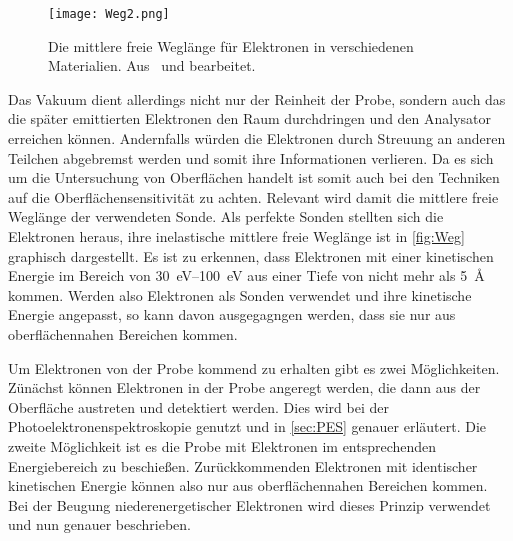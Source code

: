         \begin{figure}
            \centering
            \texttt{[image: Weg2.png]}
            \caption{Die mittlere freie Weglänge für Elektronen in verschiedenen Materialien. Aus~\cite{Hüfner} und bearbeitet.}
            \label{fig:Weg}
        \end{figure}
        Das Vakuum dient allerdings nicht nur der Reinheit der Probe, sondern auch das die später emittierten Elektronen den Raum durchdringen und den Analysator erreichen können.
        Andernfalls würden die Elektronen durch Streuung an anderen Teilchen abgebremst werden und somit ihre Informationen verlieren.
        Da es sich um die Untersuchung von Oberflächen handelt ist somit auch bei den Techniken auf die Oberflächensensitivität zu achten.
        Relevant wird damit die mittlere freie Weglänge der verwendeten Sonde.
        Als perfekte Sonden stellten sich die Elektronen heraus, ihre inelastische mittlere freie Weglänge ist in \autoref{fig:Weg} graphisch dargestellt.
        Es ist zu erkennen, dass Elektronen mit einer kinetischen Energie im Bereich von \SIrange{30}{100}{\electronvolt} aus einer Tiefe von nicht mehr als \SI{5}{\angstrom} kommen.
        Werden also Elektronen als Sonden verwendet und ihre kinetische Energie angepasst, so kann davon ausgegagngen werden, dass sie nur aus oberflächennahen Bereichen kommen.

        Um Elektronen von der Probe kommend zu erhalten gibt es zwei Möglichkeiten.
        Zünächst können Elektronen in der Probe angeregt werden, die dann aus der Oberfläche austreten und detektiert werden.
        Dies wird bei der Photoelektronenspektroskopie genutzt und in \autoref{sec:PES} genauer erläutert.
        Die zweite Möglichkeit ist es die Probe mit Elektronen im entsprechenden Energiebereich zu beschießen.
        Zurückkommenden Elektronen mit identischer kinetischen Energie können also nur aus oberflächennahen Bereichen kommen.
        Bei der Beugung niederenergetischer Elektronen wird dieses Prinzip verwendet und nun genauer beschrieben.

